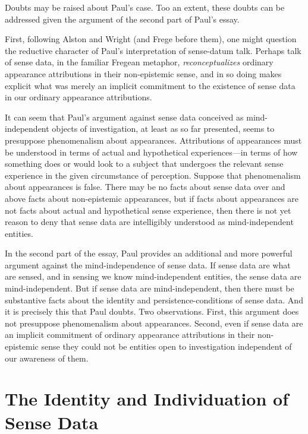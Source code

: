 \documentclass[11pt]{article}
\begin{document}
\begin{discussion}
    Doubts may be raised about Paul's case. Too an extent, these doubts can be addressed given the argument of the second part of Paul's essay.
    
    First, following Alston and Wright (and Frege before them), one might question the reductive character of Paul's interpretation of sense-datum talk. Perhaps talk of sense data, in the familiar Fregean metaphor, \emph{reconceptualizes} ordinary appearance attributions in their non-epistemic sense, and in so doing makes explicit what was merely an implicit commitment to the existence of sense data in our ordinary appearance attributions.
    
    It can seem that Paul's argument against sense data conceived as mind-independent objects of investigation, at least as so far presented, seems to presuppose phenomenalism about appearances. Attributions of appearances must be understood in terms of actual and hypothetical experiences---in terms of how something does or would look to a subject that undergoes the relevant sense experience in the given circumstance of perception. Suppose that phenomenalism about appearances is false. There may be no facts about sense data over and above facts about non-epistemic appearances, but if facts about appearances are not facts about actual and hypothetical sense experience, then there is not yet reason to deny that sense data are intelligibly understood as mind-independent entities.
    
    In the second part of the essay, Paul provides an additional and more powerful argument against the mind-independence of sense data. If sense data are what are sensed, and in sensing we know mind-independent entities, the sense data are mind-independent. But if sense data are mind-independent, then there must be substantive facts about the identity and persistence-conditions of sense data. And it is precisely this that Paul doubts. Two observations. First, this argument does not presuppose phenomenalism about appearances. Second, even if sense data are an implicit commitment of ordinary appearance attributions in their non-epistemic sense they could not be entities open to investigation independent of our awareness of them.
\end{discussion}


\section{The Identity and Individuation of Sense Data} %
\label{sec:the_identity_and_individuation_of_sense_data}
\end{document}
